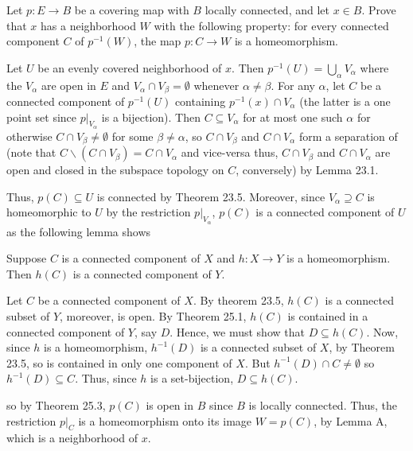 \begin{problem}
Let $p\colon E\to B$ be a covering map with $B$ locally connected, and let
$x\in B$. Prove that $x$ has a neighborhood $W$ with the following
property: for every connected component $C$ of $p^{-1}(W)$, the map
$p\colon C\to W$ is a homeomorphism.
\end{problem}
\begin{solution}
Let $U$ be an evenly covered neighborhood of $x$. Then
$p^{-1}(U)=\bigcup_\alpha V_\alpha$ where the $V_\alpha$ are open in $E$
and  $V_\alpha\cap V_\beta=\emptyset$ whenever $\alpha\neq\beta$. For any
$\alpha$, let $C$ be a connected component of $p^{-1}(U)$ containing
$p^{-1}(x)\cap V_\alpha$ (the latter is a one point set since
$\left.p\right|_{V_\alpha}$ is a bijection). Then $C\subseteq V_\alpha$ for
at most one such $\alpha$ for otherwise $C\cap V_\beta\neq\emptyset$ for
some $\beta\neq\alpha$, so $C\cap V_\beta$ and $C\cap V_\alpha$ form a
separation of (note that $C\smallsetminus(C\cap V_\beta)=C\cap V_\alpha$ and
vice-versa thus, $C\cap V_\beta$ and $C\cap V_\alpha$ are open and closed
in the subspace topology on $C$, conversely) by Lemma 23.1.

Thus, $p(C)\subseteq U$ is connected by Theorem 23.5. Moreover, since
$V_\alpha\supseteq C$ is homeomorphic to $U$ by the restriction
$\left.p\right|_{V_\alpha}$, $p(C)$ is a connected component of $U$ as the
following lemma shows
\begin{lemma}
Suppose $C$ is a connected component of $X$ and $h\colon X\to Y$ is a
homeomorphism. Then $h(C)$ is a connected component of $Y$.
\end{lemma}
\begin{solution}
\renewcommand\qedsymbol{$\clubsuit$}
Let $C$ be a connected component of $X$. By theorem 23.5, $h(C)$ is a
connected subset of $Y$, moreover, is open. By Theorem 25.1, $h(C)$ is
contained in a connected component of $Y$, say $D$. Hence, we must show
that $D\subseteq h(C)$. Now, since $h$ is a homeomorphism, $h^{-1}(D)$ is a
connected subset of $X$, by Theorem 23.5, so is contained in only one
component of $X$. But $h^{-1}(D)\cap C\neq\emptyset$ so $h^{-1}(D)\subseteq
C$. Thus, since $h$ is a set-bijection, $D\subseteq h(C)$.
\end{solution}
so by Theorem 25.3, $p(C)$ is open in $B$ since $B$ is locally
connected. Thus, the restriction $\left.p\right|_{C}$ is a homeomorphism
onto its image $W= p(C)$, by Lemma A, which is a neighborhood of $x$.
\end{solution}

